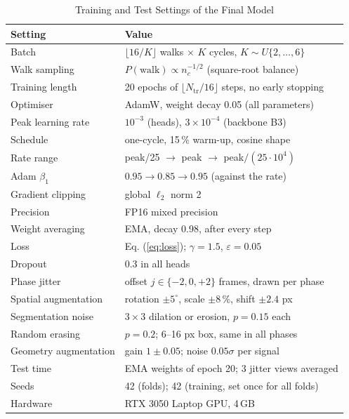 \documentclass[conference]{IEEEtran}
\begin{document}
\begin{table}[t]
\centering
\footnotesize
\caption{Training and Test Settings of the Final Model}
\label{tab:settings}
\begin{tabular}{ll}
\toprule
Setting & Value \\
\midrule
Batch & $\lfloor16/K\rfloor$ walks $\times$ $K$ cycles, $K\sim U\{2,\dots,6\}$ \\
Walk sampling & $P(\mathrm{walk})\propto n_c^{-1/2}$ (square-root balance) \\
Training length & 20 epochs of $\lfloor N_{\mathrm{tr}}/16\rfloor$ steps, no early stopping \\
Optimiser & AdamW, weight decay 0.05 (all parameters) \\
Peak learning rate & $10^{-3}$ (heads), $3\times10^{-4}$ (backbone B3) \\
Schedule & one-cycle, 15\,\% warm-up, cosine shape \\
Rate range & peak/25 $\to$ peak $\to$ peak$/(25\cdot10^4)$ \\
Adam $\beta_1$ & $0.95\to0.85\to0.95$ (against the rate) \\
Gradient clipping & global $\ell_2$ norm 2 \\
Precision & FP16 mixed precision \\
Weight averaging & EMA, decay 0.98, after every step \\
Loss & Eq. (\ref{eq:loss}); $\gamma=1.5$, $\varepsilon=0.05$ \\
Dropout & 0.3 in all heads \\
Phase jitter & offset $j\in\{-2,0,+2\}$ frames, drawn per phase \\
Spatial augmentation & rotation $\pm5^\circ$, scale $\pm8$\,\%, shift $\pm2.4$ px \\
Segmentation noise & $3\times3$ dilation or erosion, $p=0.15$ each \\
Random erasing & $p=0.2$; 6--16 px box, same in all phases \\
Geometry augmentation & gain $1\pm0.05$; noise $0.05\sigma$ per signal \\
Test time & EMA weights of epoch 20; 3 jitter views averaged \\
Seeds & 42 (folds); 42 (training, set once for all folds) \\
Hardware & RTX 3050 Laptop GPU, 4\,GB \\
\bottomrule
\end{tabular}
\end{table}
\end{document}
